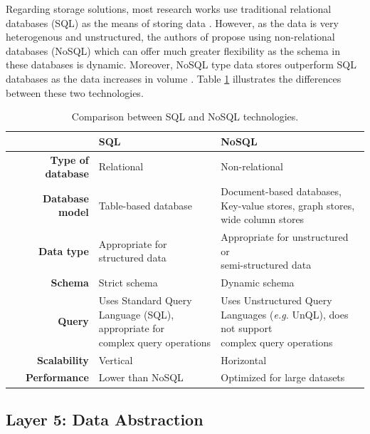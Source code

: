 Regarding storage solutions, most research works use traditional relational databases (SQL) as the means of storing data \cite{Fuhrer2006, Wu2020, Catarinucci2015, Adame2018}. However, as the data is very heterogenous and unstructured, the authors of \cite{Subahi2019} propose using non-relational databases (NoSQL) which can offer much greater flexibility as the schema in these databases is dynamic. Moreover, NoSQL type data stores outperform SQL databases as the data increases in volume \cite{Xu2014}. Table \ref{tab:comparsion-databasetech} illustrates the differences between these two technologies. 

\renewcommand{\arraystretch}{2}
\begin{table}[H]
    \centering
    \begin{tabular}{r|l|l}
        & \textbf{SQL}& \textbf{NoSQL}  \\ \hline
        \textbf{Type of database} & Relational & Non-relational \\
        \textbf{Database model} & Table-based database & \makecell{Document-based databases, \\ Key-value stores, graph stores, \\ wide column stores} \\
        \textbf{Data type} & Appropriate for structured data & \makecell{Appropriate for unstructured or \\ semi-structured data} \\ 
        \textbf{Schema} & Strict schema & Dynamic schema \\
        \textbf{Query} & \makecell{Uses Standard Query \\Language (SQL), appropriate for \\ complex query operations} & \makecell{Uses Unstructured Query \\ Languages (\textit{e.g.} UnQL), does not support \\ complex query operations}  \\ 
        \textbf{Scalability} & Vertical & Horizontal \\
        \textbf{Performance} & Lower than NoSQL & Optimized for large datasets \\
    \end{tabular}
    \caption{Comparison between SQL and NoSQL technologies.}
    \label{tab:comparsion-databasetech}
\end{table} 
\renewcommand{\arraystretch}{1}

\subsection{Layer 5: Data Abstraction}
\label{sec:iot-model-layer5}

